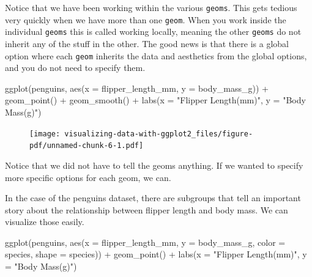 \documentclass[
  letterpaper,
  DIV=11,
  numbers=noendperiod,
  oneside]{scrreprt}
\newenvironment{Shaded}{\begin{snugshade}}{\end{snugshade}}
\newcommand{\AttributeTok}[1]{\textcolor[rgb]{0.40,0.45,0.13}{#1}}
\newcommand{\FunctionTok}[1]{\textcolor[rgb]{0.28,0.35,0.67}{#1}}
\newcommand{\NormalTok}[1]{\textcolor[rgb]{0.00,0.23,0.31}{#1}}
\newcommand{\SpecialCharTok}[1]{\textcolor[rgb]{0.37,0.37,0.37}{#1}}
\newcommand{\StringTok}[1]{\textcolor[rgb]{0.13,0.47,0.30}{#1}}
\begin{document}
Notice that we have been working within the various \texttt{geoms}. This
gets tedious very quickly when we have more than one \texttt{geom}. When
you work inside the individual \texttt{geoms} this is called working
locally, meaning the other \texttt{geoms} do not inherit any of the
stuff in the other. The good news is that there is a global option where
each \texttt{geom} inherits the data and aesthetics from the global
options, and you do not need to specify them.

\begin{Shaded}
\begin{Highlighting}[]
\FunctionTok{ggplot}\NormalTok{(penguins,}
       \FunctionTok{aes}\NormalTok{(}\AttributeTok{x =}\NormalTok{ flipper\_length\_mm,}
           \AttributeTok{y =}\NormalTok{ body\_mass\_g)) }\SpecialCharTok{+}
\FunctionTok{geom\_point}\NormalTok{() }\SpecialCharTok{+}
\FunctionTok{geom\_smooth}\NormalTok{() }\SpecialCharTok{+} 
\FunctionTok{labs}\NormalTok{(}\AttributeTok{x =} \StringTok{"Flipper Length(mm)"}\NormalTok{, }\AttributeTok{y =} \StringTok{"Body Mass(g)"}\NormalTok{)}
\end{Highlighting}
\end{Shaded}

\begin{figure}[H]

{\centering \texttt{[image: visualizing-data-with-ggplot2\_files/figure-pdf/unnamed-chunk-6-1.pdf]}

}

\end{figure}

Notice that we did not have to tell the geoms anything. If we wanted to
specify more specific options for each geom, we can.

In the case of the penguins dataset, there are subgroups that tell an
important story about the relationship between flipper length and body
mass. We can visualize those easily.

\begin{Shaded}
\begin{Highlighting}[]
\FunctionTok{ggplot}\NormalTok{(penguins,}
       \FunctionTok{aes}\NormalTok{(}\AttributeTok{x =}\NormalTok{ flipper\_length\_mm,}
           \AttributeTok{y =}\NormalTok{ body\_mass\_g,}
          \AttributeTok{color =}\NormalTok{ species,}
          \AttributeTok{shape =}\NormalTok{ species)) }\SpecialCharTok{+}
\FunctionTok{geom\_point}\NormalTok{() }\SpecialCharTok{+}
\FunctionTok{labs}\NormalTok{(}\AttributeTok{x =} \StringTok{"Flipper Length(mm)"}\NormalTok{, }\AttributeTok{y =} \StringTok{"Body Mass(g)"}\NormalTok{)}
\end{Highlighting}
\end{Shaded}
\end{document}
